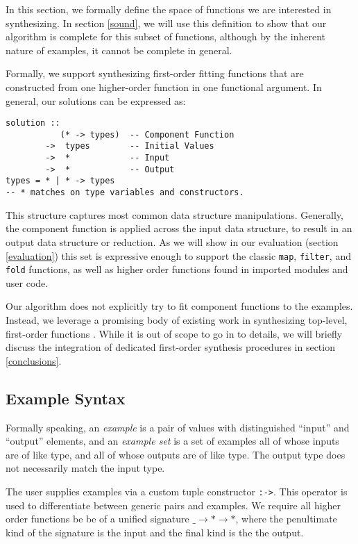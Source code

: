 In this section, we formally define the space of functions we are interested in synthesizing. In section \ref{sound}, we will use this definition to show that our algorithm is complete for this subset of functions, although by the inherent nature of examples, it cannot be complete in general.

Formally, we support synthesizing first-order fitting functions that are constructed from one higher-order function in one functional argument. In general, our solutions can be expressed as:

\begin{lstlisting}
solution ::
           (* -> types)  -- Component Function
        ->  types        -- Initial Values
        ->  *            -- Input
        ->  *            -- Output
types = * | * -> types
-- * matches on type variables and constructors.
\end{lstlisting}

This structure captures most common data structure manipulations. Generally, the component function is applied across the \textsf{input} data structure, to result in an \textsf{output} data structure or reduction. As we will show in our evaluation (section \ref{evaluation}) this set is expressive enough to support the classic \texttt{map}, \texttt{filter}, and \texttt{fold} functions, as well as higher order functions found in imported modules and user code.

Our algorithm does not explicitly try to fit component functions to the examples. Instead, we leverage a promising body of existing work in synthesizing top-level, first-order functions \cite{potential, reviewers}. While it is out of scope to go in to details, we will briefly discuss the integration of dedicated first-order synthesis procedures in section \ref{conclusions}.

\subsection{Example Syntax}\label{exampleSyntax}
Formally speaking, an \textit{example} is a pair of values with distinguished ``input'' and ``output'' elements, and an \textit{example set} is a set of examples all of whose inputs are of like type, and all of whose outputs are of like type. The output type does not necessarily match the input type.

The user supplies examples via a custom tuple constructor \texttt{:->}. This operator is used to differentiate between generic pairs and examples. 
We require all higher order functions be be of a unified signature \texttt{$\_ \to * \to *$}, where the penultimate kind of the signature is the input and the final kind is the the output.  

